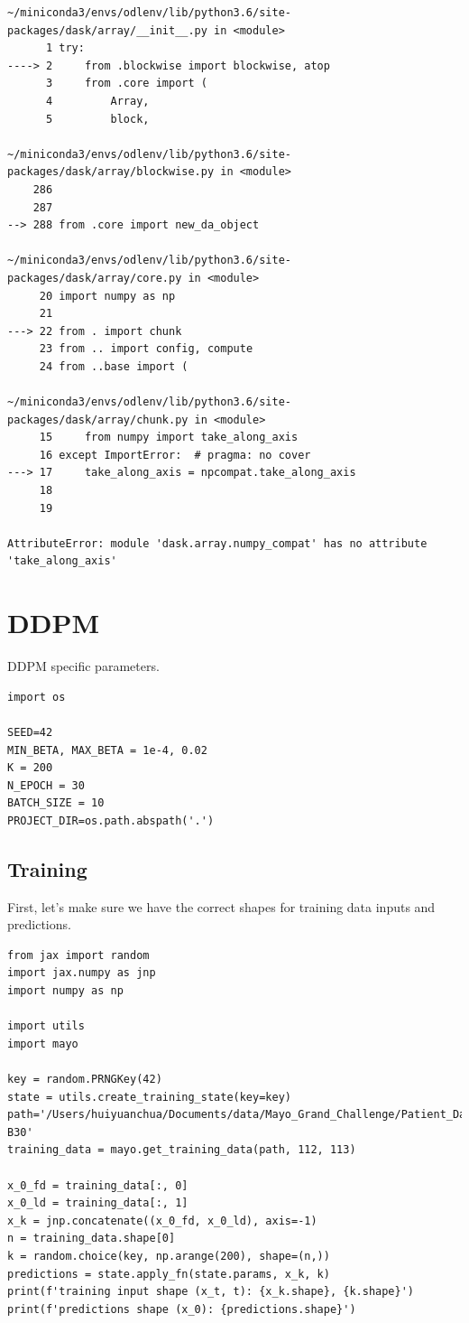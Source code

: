 \documentclass[a4paper, 11pt]{article}
\begin{document}
\begin{verbatim}
~/miniconda3/envs/odlenv/lib/python3.6/site-packages/dask/array/__init__.py in <module>
      1 try:
----> 2     from .blockwise import blockwise, atop
      3     from .core import (
      4         Array,
      5         block,

~/miniconda3/envs/odlenv/lib/python3.6/site-packages/dask/array/blockwise.py in <module>
    286 
    287 
--> 288 from .core import new_da_object

~/miniconda3/envs/odlenv/lib/python3.6/site-packages/dask/array/core.py in <module>
     20 import numpy as np
     21 
---> 22 from . import chunk
     23 from .. import config, compute
     24 from ..base import (

~/miniconda3/envs/odlenv/lib/python3.6/site-packages/dask/array/chunk.py in <module>
     15     from numpy import take_along_axis
     16 except ImportError:  # pragma: no cover
---> 17     take_along_axis = npcompat.take_along_axis
     18 
     19 

AttributeError: module 'dask.array.numpy_compat' has no attribute 'take_along_axis'
\end{verbatim}

\section{DDPM}
\label{sec:org249e0d8}
DDPM specific parameters.
\begin{verbatim}
import os

SEED=42
MIN_BETA, MAX_BETA = 1e-4, 0.02
K = 200
N_EPOCH = 30
BATCH_SIZE = 10
PROJECT_DIR=os.path.abspath('.')
\end{verbatim}

\subsection{Training}
\label{sec:org2105e76}
First, let's make sure we have the correct shapes for training data inputs and predictions.
\begin{verbatim}
from jax import random
import jax.numpy as jnp
import numpy as np

import utils
import mayo

key = random.PRNGKey(42)
state = utils.create_training_state(key=key)
path='/Users/huiyuanchua/Documents/data/Mayo_Grand_Challenge/Patient_Data/Training_Image_Data/3mm B30'
training_data = mayo.get_training_data(path, 112, 113)

x_0_fd = training_data[:, 0]
x_0_ld = training_data[:, 1]
x_k = jnp.concatenate((x_0_fd, x_0_ld), axis=-1)
n = training_data.shape[0]
k = random.choice(key, np.arange(200), shape=(n,))
predictions = state.apply_fn(state.params, x_k, k)
print(f'training input shape (x_t, t): {x_k.shape}, {k.shape}')
print(f'predictions shape (x_0): {predictions.shape}')
\end{verbatim}
\end{document}
